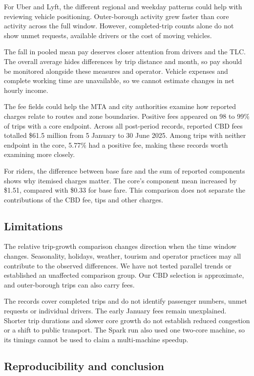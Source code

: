 \documentclass[10pt,a4paper]{article}
\newcommand{\usd}[1]{\$#1}
\begin{document}
For Uber and Lyft, the different regional and weekday patterns could help with reviewing vehicle positioning. Outer-borough activity grew faster than core activity across the full window. However, completed-trip counts alone do not show unmet requests, available drivers or the cost of moving vehicles.

The fall in pooled mean pay deserves closer attention from drivers and the TLC. The overall average hides differences by trip distance and month, so pay should be monitored alongside these measures and operator. Vehicle expenses and complete working time are unavailable, so we cannot estimate changes in net hourly income.

The fee fields could help the MTA and city authorities examine how reported charges relate to routes and zone boundaries. Positive fees appeared on 98 to 99\% of trips with a core endpoint. Across all post-period records, reported CBD fees totalled \usd{61.5} million from 5 January to 30 June 2025. Among trips with neither endpoint in the core, 5.77\% had a positive fee, making these records worth examining more closely.

For riders, the difference between base fare and the sum of reported components shows why itemised charges matter. The core's component mean increased by \usd{1.51}, compared with \usd{0.33} for base fare. This comparison does not separate the contributions of the CBD fee, tips and other charges.

\subsection{Limitations}

The relative trip-growth comparison changes direction when the time window changes. Seasonality, holidays, weather, tourism and operator practices may all contribute to the observed differences. We have not tested parallel trends or established an unaffected comparison group. Our CBD selection is approximate, and outer-borough trips can also carry fees.

The records cover completed trips and do not identify passenger numbers, unmet requests or individual drivers. The early January fees remain unexplained. Shorter trip durations and slower core growth do not establish reduced congestion or a shift to public transport. The Spark run also used one two-core machine, so its timings cannot be used to claim a multi-machine speedup.

\subsection{Reproducibility and conclusion}
\end{document}

